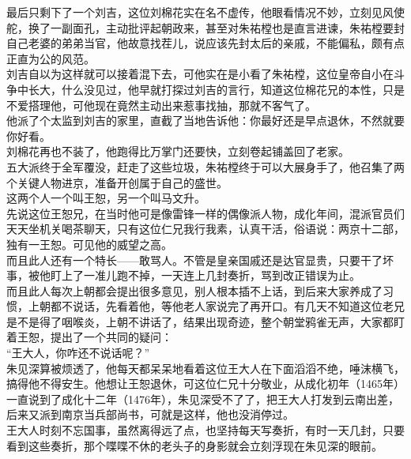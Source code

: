 \begin{multicols}{\theparacolNo}
最后只剩下了一个刘吉，这位刘棉花实在名不虚传，他眼看情况不妙，立刻见风使舵，换了一副面孔，主动批评起朝政来，甚至对朱祐樘也是直言进谏，朱祐樘要封自己老婆的弟弟当官，他故意找茬儿，说应该先封太后的亲戚，不能偏私，颇有点正直为公的风范。\\

刘吉自以为这样就可以接着混下去，可他实在是小看了朱祐樘，这位皇帝自小在斗争中长大，什么没见过，他早就打探过刘吉的言行，知道这位棉花兄的本性，只是不爱搭理他，可他现在竟然主动出来惹事找抽，那就不客气了。\\

他派了个太监到刘吉的家里，直截了当地告诉他：你最好还是早点退休，不然就要你好看。\\

刘棉花再也不装了，他跑得比万掌门还要快，立刻卷起铺盖回了老家。\\

五大派终于全军覆没，赶走了这些垃圾，朱祐樘终于可以大展身手了，他召集了两个关键人物进京，准备开创属于自己的盛世。\\

这两个人一个叫王恕，另一个叫马文升。\\

先说这位王恕兄，在当时他可是像雷锋一样的偶像派人物，成化年间，混派官员们天天坐机关喝茶聊天，只有这位仁兄我行我素，认真干活，俗语说：两京十二部，独有一王恕。可见他的威望之高。\\

而且此人还有一个特长——敢骂人。不管是皇亲国戚还是达官显贵，只要干了坏事，被他盯上了一准儿跑不掉，一天连上几封奏折，骂到改正错误为止。\\

而且此人每次上朝都会提出很多意见，别人根本插不上话，到后来大家养成了习惯，上朝都不说话，先看着他，等他老人家说完了再开口。有几天不知道这位老兄是不是得了咽喉炎，上朝不讲话了，结果出现奇迹，整个朝堂鸦雀无声，大家都盯着王恕，提出了一个共同的疑问：\\

“王大人，你咋还不说话呢？”\\

朱见深算被烦透了，他每天都呆呆地看着这位王大人在下面滔滔不绝，唾沫横飞，搞得他不得安生。他想让王恕退休，可这位仁兄十分敬业，从成化初年（1465年）一直说到了成化十二年（1476年），朱见深受不了了，把王大人打发到云南出差，后来又派到南京当兵部尚书，可就是这样，他也没消停过。\\

王大人时刻不忘国事，虽然离得远了点，也坚持每天写奏折，有时一天几封，只要看到这些奏折，那个喋喋不休的老头子的身影就会立刻浮现在朱见深的眼前。\\


\end{multicols}
